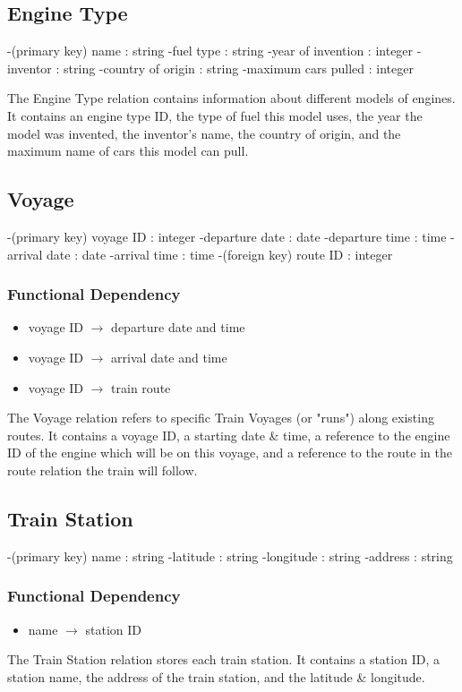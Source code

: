 \documentclass[a4paper]{article}
\begin{document}
\subsection*{Engine Type}
\begin{itemize}
-(primary key) name : string
-fuel type : string
-year of invention : integer
-inventor : string
-country of origin : string
-maximum cars pulled : integer
\end{itemize}
The Engine Type relation contains information about different models of engines. It contains an engine type ID, the type of fuel this model uses, the year the model was invented, the inventor's name, the country of origin, and the maximum name of cars this model can pull.

\subsection*{Voyage}
\begin{itemize}
-(primary key) voyage ID : integer
-departure date : date
-departure time : time
-arrival date : date
-arrival time : time
-(foreign key) route ID : integer
\end{itemize}
\subsubsection*{Functional Dependency}
\begin{itemize}
\item voyage ID $\rightarrow$ departure date and time 
\item voyage ID $\rightarrow$ arrival date and time 
\item voyage ID $\rightarrow$ train route
\end{itemize}
The Voyage relation refers to specific Train Voyages (or "runs") along existing routes. It contains a voyage ID, a starting date \& time, a reference to the engine ID of the engine which will be on this voyage, and a reference to the route in the route relation the train will follow.

\subsection*{Train Station}
\begin{itemize}
-(primary key) name : string
-latitude : string
-longitude : string
-address : string
\end{itemize}
\subsubsection*{Functional Dependency}
\begin{itemize}
\item name $\rightarrow$ station ID
\end{itemize}
The Train Station relation stores each train station. It contains a station ID, a station name, the address of the train station, and the latitude \& longitude.
\end{document}
